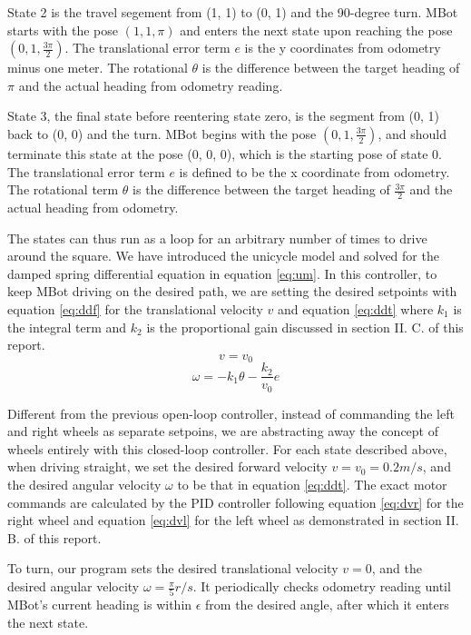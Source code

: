 \documentclass[conference]{IEEEtran}
\begin{document}
State 2 is the travel segement from (1, 1) to (0, 1) and the 90-degree turn. MBot starts with the pose $(1, 1, \pi)$ and enters the next state upon reaching the pose $(0, 1, \frac{3\pi}{2})$. The translational error term $e$ is the y coordinates from odometry minus one meter. The rotational $\theta$ is the difference between the target heading of $\pi$ and the actual heading from odometry reading.

State 3, the final state before reentering state zero, is the segment from (0, 1) back to (0, 0) and the turn. MBot begins with the pose $(0, 1, \frac{3\pi}{2})$, and should terminate this state at the pose (0, 0, 0), which is the starting pose of state 0. The translational error term $e$ is defined to be the x coordinate from odometry. The rotational term $\theta$ is the difference between the target heading of $\frac{3\pi}{2}$ and the actual heading from odometry.

The states can thus run as a loop for an arbitrary number of times to drive around the square. We have introduced the unicycle model and solved for the damped spring differential equation in equation \ref{eq:um}. In this controller, to keep MBot driving on the desired path, we are setting the desired setpoints with equation \ref{eq:ddf} for the translational velocity $v$ and equation \ref{eq:ddt} where $k_1$ is the integral term and $k_2$ is the proportional gain discussed in section II. C. of this report.
\begin{equation} \label{eq:ddf}
v = v_0
\end{equation}
\begin{equation} \label{eq:ddt}
\omega = -k_1\theta-\frac{k_2}{v_0}e
\end{equation}

Different from the previous open-loop controller, instead of commanding the left and right wheels as separate setpoins, we are abstracting away the concept of wheels entirely with this closed-loop controller. For each state described above, when driving straight, we set the desired forward velocity $v = v_0 = 0.2 m/s$, and the desired angular velocity $\omega$ to be that in equation \ref{eq:ddt}. The exact motor commands are calculated by the PID controller following equation \ref{eq:dvr} for the right wheel and equation \ref{eq:dvl} for the left wheel as demonstrated in section II. B. of this report.

To turn, our program sets the desired translational velocity $v = 0$, and the desired angular velocity $\omega = \frac{\pi}{5} r/s$. It periodically checks odometry reading until MBot's current heading is within $\epsilon$ from the desired angle, after which it enters the next state.
\end{document}
